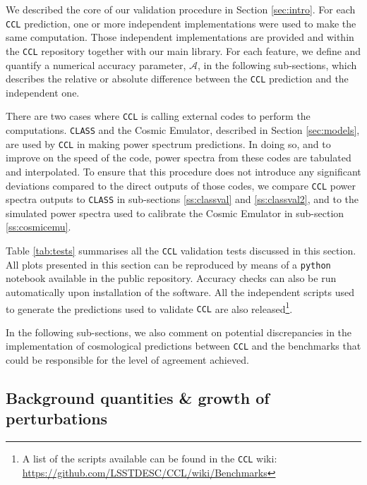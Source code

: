 \documentclass[\docopts]{\docclass}
\newcommand{\ccl}{{\tt CCL}\xspace}
\begin{document}
We described the core of our validation procedure in Section \ref{sec:intro}. For each \ccl prediction, one or more independent implementations were used to make the same computation. Those independent implementations are provided and within the \ccl repository together with our main library. For each feature, we define and quantify a numerical accuracy parameter, $\mathcal{A}$, in the following sub-sections, which describes the relative or absolute difference between the \ccl prediction and the independent one. 

There are two cases where \ccl is calling external codes to perform the computations. {\tt CLASS} and the Cosmic Emulator, described in Section \ref{sec:models}, are used by \ccl in making power spectrum predictions. In doing so, and to improve on the speed of the code, power spectra from these codes are tabulated and interpolated. To ensure that this procedure does not introduce any significant deviations compared to the direct outputs of those codes, we compare \ccl power spectra outputs to {\tt CLASS} in sub-sections \ref{ss:classval} and  \ref{ss:classval2}, and to the simulated power spectra used to calibrate the Cosmic Emulator in sub-section \ref{ss:cosmicemu}.



Table \ref{tab:tests} summarises all the \ccl validation tests discussed in this section. All plots presented in this section can be reproduced by means of a {\tt python} notebook available in the public repository. Accuracy checks can also be run automatically upon installation of the software. All the independent scripts used to generate the predictions used to validate \ccl are also released\footnote{A list of the scripts available can be found in the \ccl wiki: \url{https://github.com/LSSTDESC/CCL/wiki/Benchmarks}}.

In the following sub-sections, we also comment on potential discrepancies in the implementation of cosmological predictions between \ccl and the benchmarks that could be responsible for the level of agreement achieved.

\subsection{Background quantities \& growth of perturbations}
\end{document}
